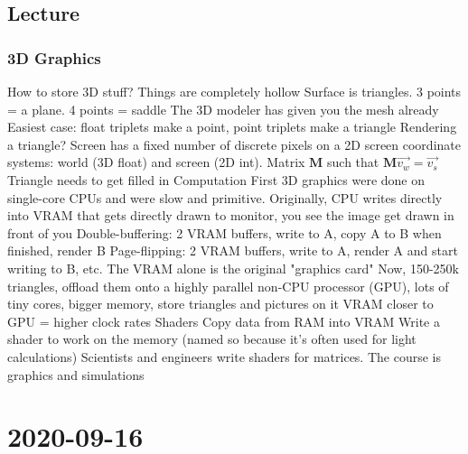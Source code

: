 \subsection{Lecture}

\subsubsection{3D Graphics}

\begin{outline}
    \1 How to store 3D stuff?
        \2 Things are completely hollow
        \2 Surface is triangles. 3 points = a plane. 4 points = saddle
        \2 The 3D modeler has given you the mesh already
        \2 Easiest case: float triplets make a point, point triplets make a triangle
    \1 Rendering a triangle?
        \2 Screen has a fixed number of discrete pixels on a 2D screen
         coordinate systems: world (3D float) and screen (2D int). 
        Matrix $\mathbf{M}$ such that $\mathbf{M}\vec{v_w} = \vec{v_s}$
        \2 Triangle needs to get filled in
    \1 Computation
        \2 First 3D graphics were done on single-core CPUs and were slow and primitive. 
        \2 Originally, CPU writes directly into VRAM that gets directly drawn to monitor, you see the image get drawn in front of you
        \2 Double-buffering: 2 VRAM buffers, write to A, copy A to B when finished, render B
        \2 Page-flipping: 2 VRAM buffers, write to A, render A and start writing to B, etc.
        \2 The VRAM alone is the original "graphics card"
        \2 Now, 150-250k triangles, offload them onto a highly parallel non-CPU processor (GPU), lots of tiny cores, bigger memory, store triangles and pictures on it
        \2 VRAM closer to GPU = higher clock rates
    \1 Shaders 
        \2 Copy data from RAM into VRAM
        \2 Write a shader to work on the memory (named so because it's often used for light calculations)
        \2 Scientists and engineers write shaders for matrices. The course is graphics and simulations

\end{outline}

\section{2020-09-16}